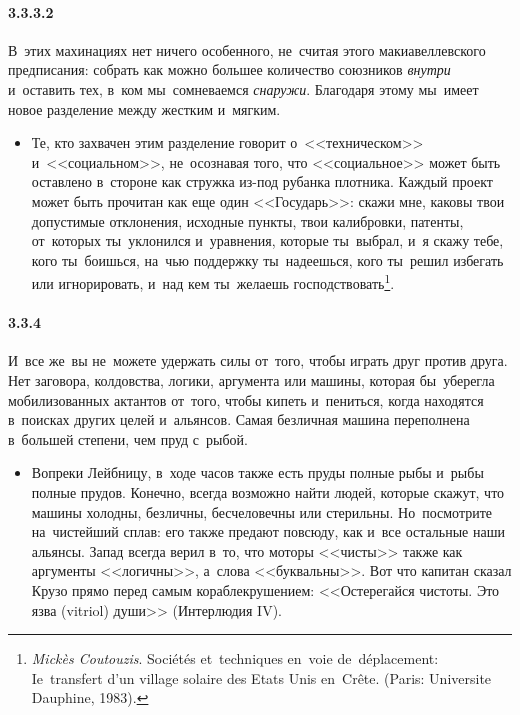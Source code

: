 \paragraph{3.3.3.2}\hypertarget{par:3.3.3.2}{} В~этих махинациях нет ничего особенного, не~считая этого макиавеллевского предписания: собрать как можно большее количество союзников {\itshape внутри} и~оставить тех, в~ком мы~сомневаемся {\itshape снаружи}. Благодаря этому мы~имеет новое разделение между жестким и~мягким.
	\begin{itemize}
	\item 
	Те, кто захвачен этим разделение говорит о~<<техническом>> и~<<социальном>>, не~осознавая того, что <<социальное>> может быть оставлено в~стороне как стружка из-под рубанка плотника. Каждый проект может быть прочитан как еще один <<Государь>>: скажи мне, каковы твои допустимые отклонения, исходные пункты, твои калибровки, патенты, от~которых ты~уклонился и~уравнения, которые ты~выбрал, и~я скажу тебе, кого ты~боишься, на~чью поддержку ты~надеешься, кого ты~решил избегать или игнорировать, и~над кем ты~желаешь господствовать\footnote{{\itshape Mick{\`e}s Coutouzis}. Soci{\'e}t{\'e}s et~techniques en~voie de~d{\'e}placement: Ie~transfert d'un village solaire des Etats Unis en~Cr\^ete. (Paris: Universite Dauphine, 1983).}.
	\end{itemize}

\paragraph{3.3.4}\hypertarget{par:3.3.4}{} И~все же~вы не~можете удержать силы от~того, чтобы играть друг против друга. Нет заговора, колдовства, логики, аргумента или машины, которая бы~уберегла мобилизованных актантов от~того, чтобы кипеть и~пениться, когда находятся в~поисках других целей и~альянсов. Самая безличная машина переполнена в~большей степени, чем пруд с~рыбой.
	\begin{itemize}
	\item 
	Вопреки Лейбницу, в~ходе часов также есть пруды полные рыбы и~рыбы полные прудов. Конечно, всегда возможно найти людей, которые скажут, что машины холодны, безличны, бесчеловечны или стерильны. Но~посмотрите на~чистейший сплав: его также предают повсюду, как и~все остальные наши альянсы. Запад всегда верил в~то, что моторы <<чисты>> также как аргументы <<логичны>>, а~слова <<буквальны>>. Вот что капитан сказал Крузо прямо перед самым кораблекрушением: <<Остерегайся чистоты. Это язва (vitriol) души>> (Интерлюдия IV).
	\end{itemize}

